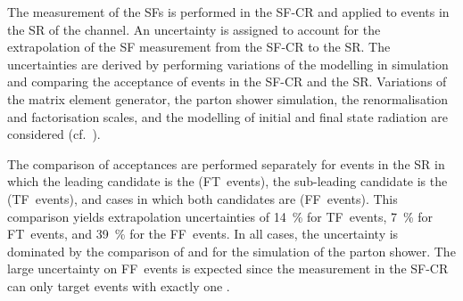 

%   

The measurement of the SFs is performed in the SF-CR and applied to events in
the SR of the \hadhad channel. An uncertainty is assigned to account for the
extrapolation of the SF measurement from the SF-CR to the \hadhad SR. The
uncertainties are derived by performing variations of the \ttbar modelling in
simulation and comparing the acceptance of \ttbarFakes events in the SF-CR and
the \hadhad SR. Variations of the matrix element generator, the parton shower
simulation, the renormalisation and factorisation scales, and the modelling of
initial and final state radiation are considered
(cf.~).

The comparison of \ttbarFakes acceptances are performed separately for events in
the \hadhad SR in which the leading \tauhadvis candidate is the \faketauhadvis
(FT~events), the sub-leading \tauhadvis candidate is the \faketauhadvis
(TF~events), and cases in which both candidates are \faketauhadvis
(FF~events). This comparison yields extrapolation uncertainties of
\SI{14}{\percent} for TF~events, \SI{7}{\percent} for FT~events, and
\SI{39}{\percent} for the FF~events. In all cases, the uncertainty is dominated
by the comparison of \PYTHIA[8] and \HERWIG[7] for the simulation of the parton
shower. The large uncertainty on FF~events is expected since the measurement in
the SF-CR can only target events with exactly one \faketauhadvis.

